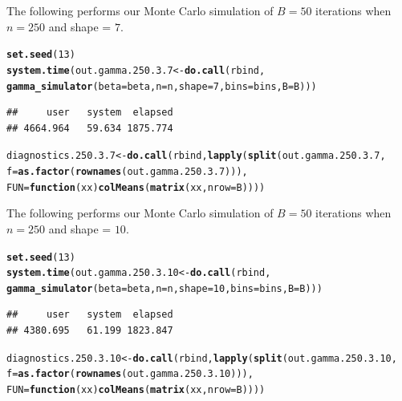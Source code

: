 \documentclass[11pt]{article}\usepackage[]{graphicx}\usepackage[]{color}
\makeatletter
\newcommand{\hlnum}[1]{\textcolor[rgb]{0.686,0.059,0.569}{#1}}%
\newcommand{\hlstd}[1]{\textcolor[rgb]{0.345,0.345,0.345}{#1}}%
\newcommand{\hlkwa}[1]{\textcolor[rgb]{0.161,0.373,0.58}{\textbf{#1}}}%
\newcommand{\hlkwb}[1]{\textcolor[rgb]{0.69,0.353,0.396}{#1}}%
\newcommand{\hlkwc}[1]{\textcolor[rgb]{0.333,0.667,0.333}{#1}}%
\newcommand{\hlkwd}[1]{\textcolor[rgb]{0.737,0.353,0.396}{\textbf{#1}}}%
\newenvironment{kframe}{%
 \def\at@end@of@kframe{}%
 \ifinner\ifhmode%
  \def\at@end@of@kframe{\end{minipage}}%
  \begin{minipage}{\columnwidth}%
 \fi\fi%
 \def\FrameCommand##1{\hskip\@totalleftmargin \hskip-\fboxsep
 \colorbox{shadecolor}{##1}\hskip-\fboxsep
     \hskip-\linewidth \hskip-\@totalleftmargin \hskip\columnwidth}%
 \MakeFramed {\advance\hsize-\width
   \@totalleftmargin\z@ \linewidth\hsize
   \@setminipage}}%
 {\par\unskip\endMakeFramed%
 \at@end@of@kframe}
\newenvironment{knitrout}{}{} %
\makeatother
\begin{document}
The following performs our Monte Carlo simulation of $B = 50$ iterations 
when $n = 250$ and shape = $7$.

\begin{knitrout}
\color{fgcolor}\begin{kframe}
\begin{alltt}
\hlkwd{set.seed}\hlstd{(}\hlnum{13}\hlstd{)}
\hlkwd{system.time}\hlstd{(out.gamma.250.3.7} \hlkwb{<-} \hlkwd{do.call}\hlstd{(rbind,}
  \hlkwd{gamma_simulator}\hlstd{(}\hlkwc{beta} \hlstd{= beta,} \hlkwc{n} \hlstd{= n,} \hlkwc{shape} \hlstd{=} \hlnum{7}\hlstd{,} \hlkwc{bins} \hlstd{= bins,} \hlkwc{B} \hlstd{= B)))}
\end{alltt}
\begin{verbatim}
##     user   system  elapsed 
## 4664.964   59.634 1875.774
\end{verbatim}
\begin{alltt}
\hlstd{diagnostics.250.3.7} \hlkwb{<-} \hlkwd{do.call}\hlstd{(rbind,} \hlkwd{lapply}\hlstd{(}\hlkwd{split}\hlstd{(out.gamma.250.3.7,}
  \hlkwc{f} \hlstd{=} \hlkwd{as.factor}\hlstd{(}\hlkwd{rownames}\hlstd{(out.gamma.250.3.7))),}
  \hlkwc{FUN} \hlstd{=} \hlkwa{function}\hlstd{(}\hlkwc{xx}\hlstd{)} \hlkwd{colMeans}\hlstd{(}\hlkwd{matrix}\hlstd{(xx,} \hlkwc{nrow} \hlstd{= B))))}
\end{alltt}
\end{kframe}
\end{knitrout}




The following performs our Monte Carlo simulation of $B = 50$ iterations 
when $n = 250$ and shape = $10$.

\begin{knitrout}
\color{fgcolor}\begin{kframe}
\begin{alltt}
\hlkwd{set.seed}\hlstd{(}\hlnum{13}\hlstd{)}
\hlkwd{system.time}\hlstd{(out.gamma.250.3.10} \hlkwb{<-} \hlkwd{do.call}\hlstd{(rbind,}
  \hlkwd{gamma_simulator}\hlstd{(}\hlkwc{beta} \hlstd{= beta,} \hlkwc{n} \hlstd{= n,} \hlkwc{shape} \hlstd{=} \hlnum{10}\hlstd{,} \hlkwc{bins} \hlstd{= bins,} \hlkwc{B} \hlstd{= B)))}
\end{alltt}
\begin{verbatim}
##     user   system  elapsed 
## 4380.695   61.199 1823.847
\end{verbatim}
\begin{alltt}
\hlstd{diagnostics.250.3.10} \hlkwb{<-} \hlkwd{do.call}\hlstd{(rbind,} \hlkwd{lapply}\hlstd{(}\hlkwd{split}\hlstd{(out.gamma.250.3.10,}
  \hlkwc{f} \hlstd{=} \hlkwd{as.factor}\hlstd{(}\hlkwd{rownames}\hlstd{(out.gamma.250.3.10))),}
  \hlkwc{FUN} \hlstd{=} \hlkwa{function}\hlstd{(}\hlkwc{xx}\hlstd{)} \hlkwd{colMeans}\hlstd{(}\hlkwd{matrix}\hlstd{(xx,} \hlkwc{nrow} \hlstd{= B))))}
\end{alltt}
\end{kframe}
\end{knitrout}
\end{document}

